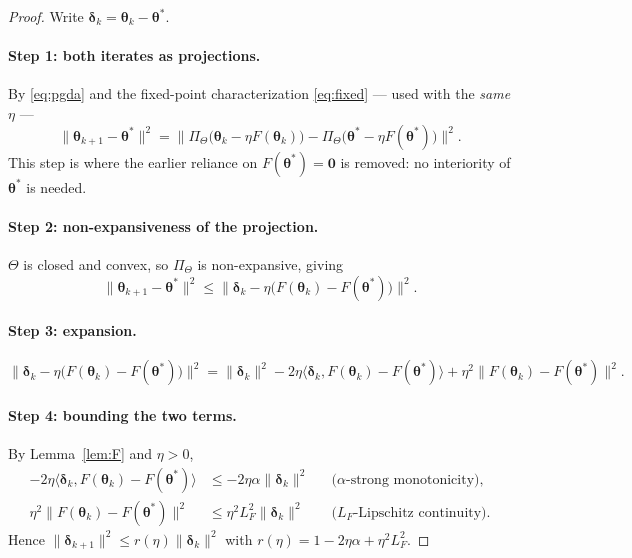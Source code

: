 \documentclass{article}
\theoremstyle{definition}
\theoremstyle{remark}
\begin{document}
\begin{proof}
Write $\boldsymbol{\delta}_k = \boldsymbol{\theta}_k - \boldsymbol{\theta}^*$.

\paragraph{Step 1: both iterates as projections.}
By \eqref{eq:pgda} and the fixed-point characterization \eqref{eq:fixed} --- used with the \emph{same} $\eta$ ---
\begin{equation}
\|\boldsymbol{\theta}_{k+1} - \boldsymbol{\theta}^*\|^{2}
= \big\| \Pi_\Theta\big(\boldsymbol{\theta}_k - \eta F(\boldsymbol{\theta}_k)\big)
- \Pi_\Theta\big(\boldsymbol{\theta}^* - \eta F(\boldsymbol{\theta}^*)\big) \big\|^{2}.
\end{equation}
This step is where the earlier reliance on $F(\boldsymbol{\theta}^*) = \mathbf{0}$ is removed: no interiority of
$\boldsymbol{\theta}^*$ is needed.

\paragraph{Step 2: non-expansiveness of the projection.}
$\Theta$ is closed and convex, so $\Pi_\Theta$ is non-expansive, giving
\begin{equation}
\|\boldsymbol{\theta}_{k+1} - \boldsymbol{\theta}^*\|^{2}
\le \big\| \boldsymbol{\delta}_k - \eta \big(F(\boldsymbol{\theta}_k) - F(\boldsymbol{\theta}^*)\big) \big\|^{2}.
\end{equation}

\paragraph{Step 3: expansion.}
\begin{equation}
\big\| \boldsymbol{\delta}_k - \eta \big(F(\boldsymbol{\theta}_k) - F(\boldsymbol{\theta}^*)\big) \big\|^{2}
= \|\boldsymbol{\delta}_k\|^{2}
- 2\eta \big\langle \boldsymbol{\delta}_k, F(\boldsymbol{\theta}_k) - F(\boldsymbol{\theta}^*) \big\rangle
+ \eta^{2} \big\| F(\boldsymbol{\theta}_k) - F(\boldsymbol{\theta}^*) \big\|^{2}.
\end{equation}

\paragraph{Step 4: bounding the two terms.}
By Lemma~\ref{lem:F} and $\eta > 0$,
\begin{align}
- 2\eta \big\langle \boldsymbol{\delta}_k, F(\boldsymbol{\theta}_k) - F(\boldsymbol{\theta}^*) \big\rangle
&\le -2\eta\alpha \|\boldsymbol{\delta}_k\|^{2}
&&\text{($\alpha$-strong monotonicity)}, \\
\eta^{2} \big\| F(\boldsymbol{\theta}_k) - F(\boldsymbol{\theta}^*) \big\|^{2}
&\le \eta^{2} L_F^{2} \|\boldsymbol{\delta}_k\|^{2}
&&\text{($L_F$-Lipschitz continuity)} .
\end{align}
Hence $\|\boldsymbol{\delta}_{k+1}\|^{2} \le r(\eta) \|\boldsymbol{\delta}_k\|^{2}$ with
$r(\eta) = 1 - 2\eta\alpha + \eta^{2} L_F^{2}$.


\end{proof}
\end{document}
